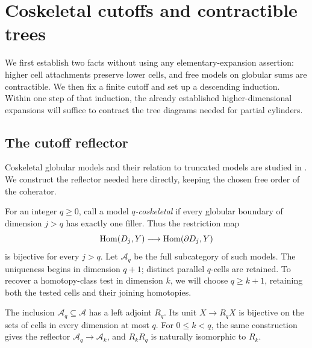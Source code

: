 \section{Coskeletal cutoffs and contractible trees}
\label{sec:cutoffs-trees}

We first establish two facts without using any elementary-expansion
assertion: higher cell attachments preserve lower cells, and free models
on globular sums are contractible.  We then fix a finite cutoff and set
up a descending induction.  Within one step of that induction, the
already established higher-dimensional expansions will suffice to
contract the tree diagrams needed for partial cylinders.

\subsection{The cutoff reflector}

Coskeletal globular models and their relation to truncated models are
studied in \cite[Section~2]{HenryLanari2023}.  We construct the reflector
needed here directly, keeping the chosen free order of the coherator.

For an integer $q\geq0$, call a model \emph{$q$-coskeletal} if every
globular boundary of dimension $j>q$ has exactly one filler.  Thus the
restriction map
\[
 \operatorname{Hom}(D_j,Y)\longrightarrow\operatorname{Hom}(\partial D_j,Y)
\]
is bijective for every $j>q$.  Let $\mathcal A_q$ be the full subcategory
of such models.  The uniqueness begins in dimension $q+1$; distinct
parallel $q$-cells are retained.
To recover a homotopy-class test in dimension $k$, we will choose
$q\geq k+1$, retaining both the tested cells and their joining homotopies.

\begin{lemma}\label{lem:cutoff}
The inclusion $\mathcal A_q\subseteq\mathcal A$ has a left adjoint
$R_q$.  Its unit $X\longrightarrow R_qX$ is bijective on the sets of
cells in every dimension at most $q$.  For $0\leq k<q$, the same
construction gives the reflector $\mathcal A_q\to\mathcal A_k$,
and $R_kR_q$ is naturally isomorphic to $R_k$.
\end{lemma}


